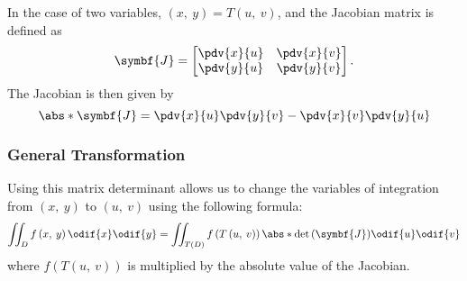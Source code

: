 \documentclass{article}
\begin{document}
In the case of two variables, \(\left( x,\: y \right) = T\left( u,\: v \right)\),
and the Jacobian matrix is defined as
\begin{equation*}
    \symbf{J} =
    \begin{bmatrix}
        \displaystyle\pdv{x}{u} & \displaystyle\pdv{x}{v} \\
        \displaystyle\pdv{y}{u} & \displaystyle\pdv{y}{v} \\
    \end{bmatrix}
    .
\end{equation*}
The Jacobian is then given by
\begin{equation*}
    \abs*{\symbf{J}} = \pdv{x}{u} \pdv{y}{v} - \pdv{x}{v} \pdv{y}{u}
\end{equation*}
\subsubsection{General Transformation}
Using this matrix determinant allows us to change the variables of
integration from \(\left( x,\: y \right)\) to \(\left( u,\: v \right)\)
using the following formula:
\begin{equation*}
    \iint_D f\left( x,\: y \right) \odif{x}\odif{y} = \iint_{T\left( D \right)} f\left( T\left( u,\: v \right) \right) \abs*{\det{\left( \symbf{J} \right)}} \odif{u}\odif{v}
\end{equation*}
where \(f\left( T\left( u,\: v \right) \right)\) is multiplied by the absolute value of the
Jacobian.
\end{document}
